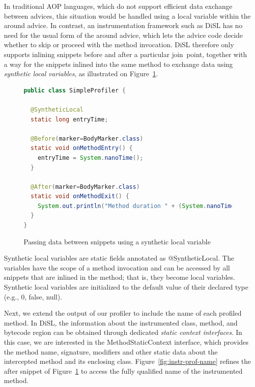 \documentclass{article}
\newcommand{\brcode}[1]{\textsf{#1}}
\newcommand{\code}[1]{\mbox{\brcode{#1}}}
\begin{document}
In traditional AOP languages, which do not support efficient data exchange between advices, this situation would be handled using a local variable within the around advice.
In contrast, an instrumentation framework such as DiSL has no need for the usual form of the around advice, which lets the advice code decide whether to skip or proceed with the method invocation.
DiSL therefore only supports inlining snippets before and after a particular join~point, together with a way for the snippets inlined into the same method to exchange data using \emph{synthetic local variables}, as illustrated on Figure~\ref{fig:instr-prof-time}.

\begin{figure}[h!]
\smaller
\begin{lstlisting}[language=Java]
public class SimpleProfiler {

  @SyntheticLocal
  static long entryTime;

  @Before(marker=BodyMarker.class)
  static void onMethodEntry() {
    entryTime = System.nanoTime();
  }

  @After(marker=BodyMarker.class)
  static void onMethodExit() {
    System.out.println("Method duration " + (System.nanoTime() - entryTime));
  }
}
\end{lstlisting}
\caption{Passing data between snippets using a synthetic local variable}
\label{fig:instr-prof-time}
\end{figure}

Synthetic local variables are static fields annotated as \code{@SyntheticLocal}.
The variables have the scope of a method invocation and can be accessed by all snippets that are inlined in the method; that is, they become local variables.
Synthetic local variables are initialized to the default value of their declared type (e.g., \code{0}, \code{false}, \code{null}).

\medskip

Next, we extend the output of our profiler to include the name of each profiled method.
In DiSL, the information about the instrumented class, method, and bytecode region can be obtained through dedicated \emph{static context interfaces}.
In this case, we are interested in the \code{MethodStaticContext} interface, which provides the method name, signature, modifiers and other static data about the intercepted method and its enclosing class.
Figure~\ref{fig:instr-prof-name} refines the after snippet of Figure~\ref{fig:instr-prof-time} to access the fully qualified name of the instrumented method.
\end{document}
